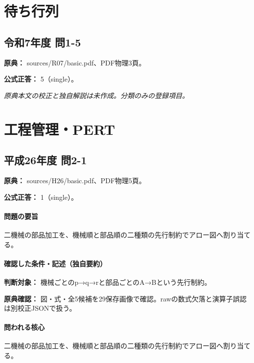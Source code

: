 \section{待ち行列}

\subsection{令和7年度 問1-5}
\label{q:r07-reg-basic-1-5}

\noindent\textbf{原典：} sources/R07/basic.pdf、PDF物理3頁。

\textbf{公式正答：} 5（single）。

\par\textit{原典本文の校正と独自解説は未作成。分類のみの登録項目。}

\section{工程管理・PERT}

\subsection{平成26年度 問2-1}
\label{q:h26-reg-basic-2-1}

\noindent\textbf{原典：} sources/H26/basic.pdf、PDF物理5頁。

\textbf{公式正答：} 1（single）。

\paragraph{問題の要旨} 二機械の部品加工を、機械順と部品順の二種類の先行制約でアロー図へ割り当てる。

\paragraph{確認した条件・記述（独自要約）}\mbox{}\par

\noindent\textbf{判断対象：} 機械ごとのp→q→rと部品ごとのA→Bという先行制約。\par

\noindent\textbf{原典確認：} 図・式・全5候補を29保存画像で確認。rawの数式欠落と演算子誤認は別校正JSONで扱う。\par

\paragraph{問われる核心} 二機械の部品加工を、機械順と部品順の二種類の先行制約でアロー図へ割り当てる。


